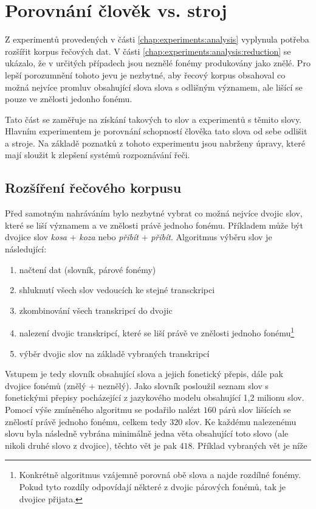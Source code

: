 \section{Porovnání člověk vs. stroj}
\label{chap:experiments:normalization}

Z experimentů provedených v části \ref{chap:experiments:analysis} vyplynula potřeba rozšířit korpus řečových dat. V části \ref{chap:experiments:analysis:reduction} se ukázalo, že v určitých případech jsou neznělé fonémy produkovány jako znělé. Pro lepší porozumnění tohoto jevu je nezbytné, aby řecový korpus obsahoval co možná nejvíce promluv obsahující slova slova s odlišným významem, ale lišící se pouze ve znělosti jedonho fonému.

Tato část se zaměřuje na získání takových to slov a experimentů s těmito slovy. Hlavním experimentem je porovnání schopností člověka tato slova od sebe odlišit a stroje. Na základě poznatků z tohoto experimentu jsou nabrženy úpravy, které mají sloužit k zlepšení systémů rozpoznávání řeči.

\subsection{Rozšíření řečového korpusu}
\label{chap:experiments:normalization:corpus}

Před samotným nahráváním bylo nezbytné vybrat co možná nejvíce dvojic slov, které se liší významem a ve znělosti právě jednoho fonému. Příkladem může být dvojice slov \textit{kosa} + \textit{koza} nebo \textit{přibít} + \textit{přibít}. Algoritmus výběru slov je následující:

\begin{enumerate}
  \item načtení dat (slovník, párové fonémy)
  \item shluknutí všech slov vedoucích ke stejné transckripci
  \item zkombinování všech transkripcí do dvojic
  \item nalezení dvojic transkripcí, které se liší právě ve znělosti jednoho fonému\footnote{Konkrétně algoritmus vzájemně porovná obě slova a najde rozdílné fonémy. Pokud tyto rozdíly odpovídají některé z dvojic párových fonémů, tak je dvojice přijata.}
  \item výběr dvojic slov na základě vybraných transkripcí
\end{enumerate}

Vstupem je tedy slovník obsahující slova a jejich fonetický přepis, dále pak dvojice fonémů (znělý + neznělý). Jako slovník posloužil seznam slov s fonetickými přepisy pocházející z jazykového modelu obsahující 1,2 milionu slov. Pomocí výše zmíněného algoritmu se podařilo nalézt $160$ párů slov lišících se znělostí právě jednoho fonému, celkem tedy $320$ slov. Ke každému nalezenému slovu byla následně vybrána minimálně jedna věta obsahující toto slovo (ale nikoli druhé slovo z dvojice), těchto vět je pak $418$. Příklad vybraných vět je níže

